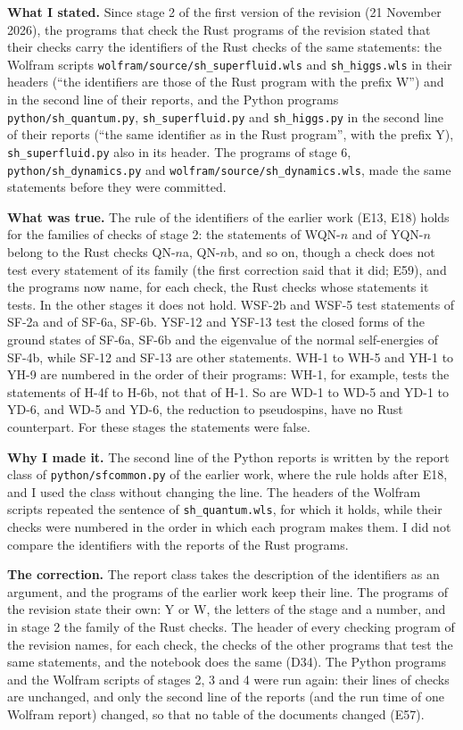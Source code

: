 \documentclass[
  10pt,
]{article}
\begin{document}
\textbf{What I stated.} Since stage 2 of the first version of the
revision (21 November 2026), the programs that check the Rust programs
of the revision stated that their checks carry the identifiers of the
Rust checks of the same statements: the Wolfram scripts
\texttt{wolfram/source/sh\_superfluid.wls} and \texttt{sh\_higgs.wls} in
their headers (``the identifiers are those of the Rust program with the
prefix W'') and in the second line of their reports, and the Python
programs \texttt{python/sh\_quantum.py}, \texttt{sh\_superfluid.py} and
\texttt{sh\_higgs.py} in the second line of their reports (``the same
identifier as in the Rust program'', with the prefix Y),
\texttt{sh\_superfluid.py} also in its header. The programs of stage 6,
\texttt{python/sh\_dynamics.py} and
\texttt{wolfram/source/sh\_dynamics.wls}, made the same statements
before they were committed.

\textbf{What was true.} The rule of the identifiers of the earlier work
(E13, E18) holds for the families of checks of stage 2: the statements
of WQN-\(n\) and of YQN-\(n\) belong to the Rust checks QN-\(n\)a,
QN-\(n\)b, and so on, though a check does not test every statement of
its family (the first correction said that it did; E59), and the
programs now name, for each check, the Rust checks whose statements it
tests. In the other stages it does not hold. WSF-2b and WSF-5 test
statements of SF-2a and of SF-6a, SF-6b. YSF-12 and YSF-13 test the
closed forms of the ground states of SF-6a, SF-6b and the eigenvalue of
the normal self-energies of SF-4b, while SF-12 and SF-13 are other
statements. WH-1 to WH-5 and YH-1 to YH-9 are numbered in the order of
their programs: WH-1, for example, tests the statements of H-4f to H-6b,
not that of H-1. So are WD-1 to WD-5 and YD-1 to YD-6, and WD-5 and
YD-6, the reduction to pseudospins, have no Rust counterpart. For these
stages the statements were false.

\textbf{Why I made it.} The second line of the Python reports is written
by the report class of \texttt{python/sfcommon.py} of the earlier work,
where the rule holds after E18, and I used the class without changing
the line. The headers of the Wolfram scripts repeated the sentence of
\texttt{sh\_quantum.wls}, for which it holds, while their checks were
numbered in the order in which each program makes them. I did not
compare the identifiers with the reports of the Rust programs.

\textbf{The correction.} The report class takes the description of the
identifiers as an argument, and the programs of the earlier work keep
their line. The programs of the revision state their own: Y or W, the
letters of the stage and a number, and in stage 2 the family of the Rust
checks. The header of every checking program of the revision names, for
each check, the checks of the other programs that test the same
statements, and the notebook does the same (D34). The Python programs
and the Wolfram scripts of stages 2, 3 and 4 were run again: their lines
of checks are unchanged, and only the second line of the reports (and
the run time of one Wolfram report) changed, so that no table of the
documents changed (E57).
\end{document}
